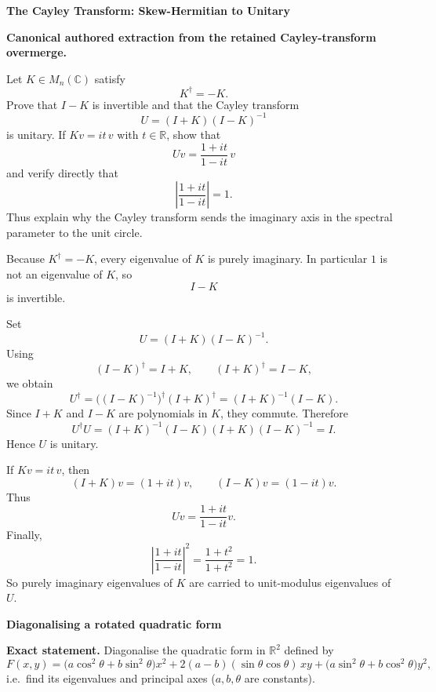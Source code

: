 \begin{problem}[CP-I-0098]
\label{prob:cp-i-0098}
\textbf{The Cayley Transform: Skew-Hermitian to Unitary}

\textbf{Canonical authored extraction from the retained Cayley-transform overmerge.}

\hspace*{1.5em}Let \(K\in M_n(\mathbb C)\) satisfy
\[
K^\dagger=-K.
\]
Prove that \(I-K\) is invertible and that the Cayley transform
\[
U=(I+K)(I-K)^{-1}
\]
is unitary. If \(Kv=it\,v\) with \(t\in\mathbb R\), show that
\[
Uv=\frac{1+it}{1-it}\,v
\]
and verify directly that
\[
\left|\frac{1+it}{1-it}\right|=1.
\]
Thus explain why the Cayley transform sends the imaginary axis in the spectral parameter to the
unit circle.
\end{problem}

\begin{solution}
Because \(K^\dagger=-K\), every eigenvalue of \(K\) is purely imaginary. In particular \(1\)
is not an eigenvalue of \(K\), so
\[
I-K
\]
is invertible.

Set
\[
U=(I+K)(I-K)^{-1}.
\]
Using
\[
(I-K)^\dagger=I+K,\qquad
(I+K)^\dagger=I-K,
\]
we obtain
\[
U^\dagger
=
\bigl((I-K)^{-1}\bigr)^\dagger (I+K)^\dagger
=
(I+K)^{-1}(I-K).
\]
Since \(I+K\) and \(I-K\) are polynomials in \(K\), they commute. Therefore
\[
U^\dagger U
=
(I+K)^{-1}(I-K)(I+K)(I-K)^{-1}
=
I.
\]
Hence \(U\) is unitary.

If \(Kv=it\,v\), then
\[
(I+K)v=(1+it)v,\qquad
(I-K)v=(1-it)v.
\]
Thus
\[
Uv=\frac{1+it}{1-it}v.
\]
Finally,
\[
\left|\frac{1+it}{1-it}\right|^2
=
\frac{1+t^2}{1+t^2}
=
1.
\]
So purely imaginary eigenvalues of \(K\) are carried to unit-modulus eigenvalues of \(U\).
\end{solution}

\begin{problem}[CP-I-0101]
\label{prob:cp-i-0101}
\textbf{Diagonalising a rotated quadratic form}

\textbf{Exact statement.}
\hspace*{1.5em}Diagonalise the quadratic form in $\mathbb R^2$ defined by
\[
F(x,y)=\bigl(a\cos^2\theta+b\sin^2\theta\bigr)x^2
+2(a-b)(\sin\theta\cos\theta)\,xy
+\bigl(a\sin^2\theta+b\cos^2\theta\bigr)y^2,
\]
i.e.\ find its eigenvalues and principal axes ($a,b,\theta$ are constants).

\end{problem}

